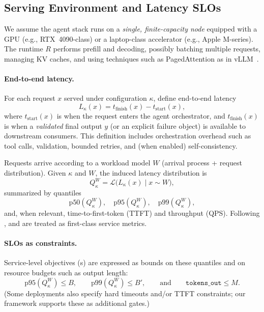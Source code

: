 \subsection{Serving Environment and Latency SLOs}
\label{sec:problem-slo}

We assume the agent stack runs on a \emph{single, finite-capacity node} equipped with a GPU (e.g., RTX~4090-class) or a laptop-class accelerator (e.g., Apple M-series).
The runtime $R$ performs prefill and decoding, possibly batching multiple requests, managing KV caches, and using techniques such as PagedAttention as in vLLM~\citep{kwon2023vllm}.

\paragraph{End-to-end latency.}
For each request $x$ served under configuration $\kappa$, define end-to-end latency
\[
L_\kappa(x) = t_{\text{finish}}(x) - t_{\text{start}}(x),
\]
where $t_{\text{start}}(x)$ is when the request enters the agent orchestrator, and $t_{\text{finish}}(x)$ is when a \emph{validated} final output $y$ (or an explicit failure object) is available to downstream consumers.
This definition includes orchestration overhead such as tool calls, validation, bounded retries, and (when enabled) self-consistency.

Requests arrive according to a workload model $W$ (arrival process + request distribution).
Given $\kappa$ and $W$, the induced latency distribution is
\[
Q_\kappa^W = \mathcal{L}\bigl(L_\kappa(x)\mid x\sim W\bigr),
\]
summarized by quantiles
\[
\mathrm{p50}(Q_\kappa^W),\quad \mathrm{p95}(Q_\kappa^W),\quad \mathrm{p99}(Q_\kappa^W),
\]
and, when relevant, time-to-first-token (TTFT) and throughput (QPS).
Following \citet{dean2013tail}, \pninetyfive and \pninetynine are treated as first-class service metrics.

\paragraph{SLOs as constraints.}
Service-level objectives (\slo s) are expressed as bounds on these quantiles and on resource budgets such as output length:
\[
\mathrm{p95}(Q_\kappa^W)\le B,\qquad \mathrm{p99}(Q_\kappa^W)\le B',\qquad \text{and}\qquad \texttt{tokens\_out}\le M.
\]
(Some deployments also specify hard timeouts and/or TTFT constraints; our framework supports these as additional gates.)

